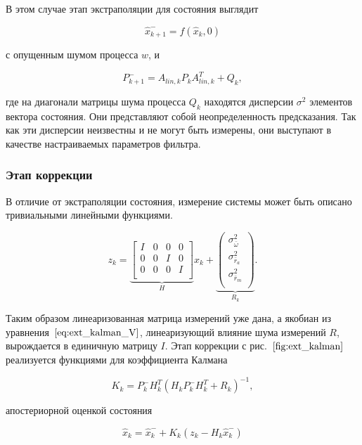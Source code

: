 \documentclass[12pt,a4paper]{article}
\begin{document}
В этом случае этап экстраполяции для состояния выглядит

$$ \hat x_{k+1}^- = f(\hat x_k,0) $$

с опущенным шумом процесса $w$, и

$$ P_{k+1}^- = A_{lin,k}P_k A_{lin,k}^T + Q_k,$$

где на диагонали матрицы шума процесса $Q_k$ находятся дисперсии $\sigma^2$ элементов вектора состояния. Они представляют собой неопределенность предсказания. Так как эти дисперсии неизвестны и не могут быть измерены, они выступают в качестве настраиваемых параметров фильтра.


\subsubsection{Этап коррекции}

В отличие от экстраполяции состояния, измерение системы может быть описано тривиальными линейными функциями.

\begin{equation}
	\label{eq:ext_kalman_meas_impl}
	z_k = \underbrace{
		\begin{bmatrix}
			I & 0 & 0 & 0 \\
			0 & 0 & I & 0 \\
			0 & 0 & 0 & I \\
		\end{bmatrix}
	}_H
	x_k + \underbrace{
		\begin{pmatrix}
			\sigma_{\bar\omega}^2 \\
			\sigma_{\bar r_a}^2 \\
			\sigma_{\bar r_m}^2 \\
		\end{pmatrix}
	}_{R_k}.
\end{equation}

Таким образом линеаризованная матрица измерений уже дана, а якобиан из уравнения~$\eqref{eq:ext_kalman_V}$, линеаризующий влияние шума измерений $R$, вырождается в единичную матрицу $I$. Этап коррекции с рис.~$\ref{fig:ext_kalman}$ реализуется функциями для коэффициента Калмана

\begin{equation}
\label{eq:ext_kalman_K}
	K_k = P_k^- H_k^T \left(H_k P_k^- H_k^T + R_k\right)^{-1},
\end{equation}

апостериорной оценкой состояния

\begin{equation}
\label{eq:ext_kalman_x_apost}
	\hat x_k = \hat x_k^- + K_k(z_k - H_k \hat x_k^-)
\end{equation}
\end{document}
